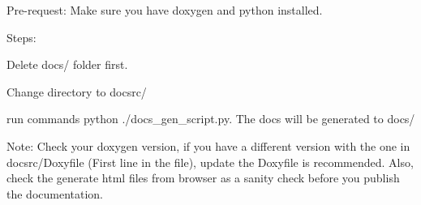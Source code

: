 
\begin{DoxyItemize}
\item Pre-\/request\+: Make sure you have doxygen and python installed.
\item Steps\+:
\begin{DoxyItemize}
\item Delete docs/ folder first.
\item Change directory to docsrc/
\item run commands {\ttfamily python ./docs\+\_\+gen\+\_\+script.py}. The docs will be generated to docs/
\end{DoxyItemize}
\end{DoxyItemize}

Note\+: Check your doxygen version, if you have a different version with the one in docsrc/\+Doxyfile (First line in the file), update the Doxyfile is recommended. Also, check the generate html files from browser as a sanity check before you publish the documentation. 